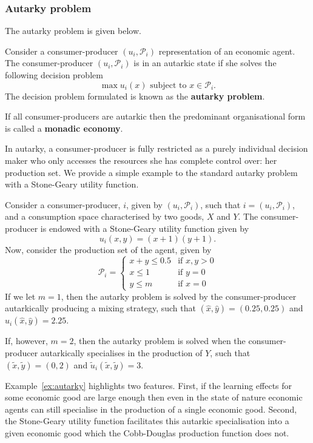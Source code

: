 \begin{subappendices}
\subsubsection{Autarky problem}

The autarky problem is given below.
\begin{definition} \label{def:autarkyproblem}
Consider a consumer-producer $(u_{i}, \mathcal{P}_i)$ representation of an economic agent. The consumer-producer $(u_{i}, \mathcal{P}_i)$ is in an autarkic state if she solves the following decision problem
\begin{equation}
\max u_{i}(x) \mbox{ subject to } x \in \mathcal{P}_{i} .
\end{equation}
The decision problem formulated is known as the \textbf{autarky problem}.

If all consumer-producers are autarkic then the predominant organisational form is called a \textbf{monadic economy}.
\end{definition}
In autarky, a consumer-producer is fully restricted as a purely individual decision maker who only accesses the resources she has complete control over: her production set. We provide a simple example to the standard autarky problem with a Stone-Geary utility function.
\begin{example} \label{ex:autarky}
Consider a consumer-producer, $i$, given by $(u_{i}, \mathcal{P}_i)$, such that $i = (u_{i}, \mathcal{P}_i)$, and a consumption space characterised by two goods, $X$ and $Y$. The consumer-producer is endowed with a Stone-Geary utility function given by
\begin{equation*}
u_{i}(x, y) = (x + 1)(y + 1) .
\end{equation*}
Now, consider the production set of the agent, given by
\[ \mathcal{P}_{i} = \left\{ \begin{array}{ll}
         x + y \leqslant 0.5 & \mbox{if $x,y > 0$}\\
		 x \leqslant 1 & \mbox{if $y = 0$}\\
         y \leqslant m & \mbox{if $x = 0$}\end{array} \right. \]
If we let $m = 1$, then the autarky problem is solved by the consumer-producer autarkically producing a mixing strategy, such that $(\hat{x}, \hat{y}) = (0.25, 0.25)$ and $\hat{u}_{i}(\hat{x}, \hat{y}) = 2.25$.

If, however, $m = 2$, then the autarky problem is solved when the consumer-producer autarkically specialises in the production of $Y$, such that $(\tilde{x}, \tilde{y}) = (0, 2)$ and $\tilde{u}_{i}(\tilde{x}, \tilde{y}) = 3$.
\end{example}
Example~\ref{ex:autarky} highlights two features. First, if the learning effects for some economic good are large enough then even in the state of nature economic agents can still specialise in the production of a single economic good. Second, the Stone-Geary utility function facilitates this autarkic specialisation into a given economic good which the Cobb-Douglas production function does not.


\end{subappendices}
